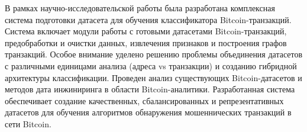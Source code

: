 \abstract %

В рамках научно-исследовательской работы была разработана комплексная система подготовки датасета для обучения классификатора Bitcoin-транзакций. Система включает модули работы с готовыми датасетами Bitcoin-транзакций, предобработки и очистки данных, извлечения признаков и построения графов транзакций. Особое внимание уделено решению проблемы объединения датасетов с различными единицами анализа (адреса vs транзакции) и созданию гибридной архитектуры классификации. Проведен анализ существующих Bitcoin-датасетов и методов дата инжиниринга в области Bitcoin-аналитики. Разработанная система обеспечивает создание качественных, сбалансированных и репрезентативных датасетов для обучения алгоритмов обнаружения мошеннических транзакций в сети Bitcoin.

